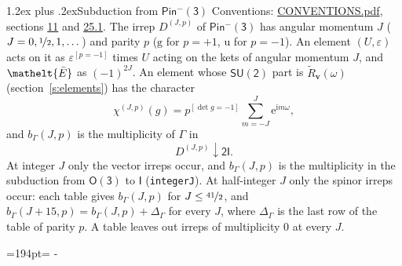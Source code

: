 \documentclass[10pt,a4paper]{article}
\makeatletter
\renewcommand\section{\@startsection{section}{1}{\z@}{-3ex plus -1ex minus -.2ex}%
  {1.2ex plus .2ex}{\normalfont\large\sffamily\bfseries\color{parttitle}}}
\newcommand{\needspace}[1]{\par\penalty-100\begingroup\dimen0=#1\relax\dimen2=\pagegoal
  \advance\dimen2-\pagetotal\ifdim\dimen0>\dimen2\relax\ifdim\dimen2>0pt\vfil\break\fi\fi
  \endgroup}
\numberwithin{equation}{section}
\newcommand{\eltfont}[1]{{\let\sigma\eltsigma\mathelt{#1}}}
\newcommand{\grp}[1]{\mathsf{#1}}
\newcommand{\elt}[1]{\eltfont{#1}}
\newcommand{\ptag}[1]{\mathrm{#1}}
\newcommand{\iverson}[1]{[#1]}
\newcommand{\restr}[2]{#1\!\downarrow#2}
\newcommand{\vv}{\mathbf{v}}
\newcommand{\iunit}{\mathrm{i}}
\newcommand{\expe}{\mathrm{e}}
\newcommand{\irrJp}[2]{D^{(#1,#2)}}
\newcommand{\barred}[1]{\bar{#1}}
\newcommand{\lift}[1]{\tilde{#1}}
\makeatother
\begin{document}
\section{Subduction from \texorpdfstring{$\grp{Pin^{-}(3)}$}{Pin(3)}}\label{s:subduction_parent}
Conventions: \href{../../CONVENTIONS.pdf}{CONVENTIONS.pdf}, sections \href{../../../rotation/CONVENTIONS.pdf\#conv.11}{11} and \href{../../CONVENTIONS.pdf\#conv.25.1}{25.1}.
\leavevmode\label{n:index.J}\label{n:index.parity}\label{n:irrep.o3}The irrep $\irrJp{J}{p}$ of \href{Pinminus3.pdf}{$\grp{Pin^{-}(3)}$} has angular momentum $J$ ($J = 0, \nicefrac{1}{2}, 1, \dots$) and parity $p$ ($\ptag{g}$ for $p = +1$, $\ptag{u}$ for $p = -1$). An element $(U, \varepsilon)$ acts on it as $\varepsilon^{[p = -1]}$ times $U$ acting on the kets of angular momentum $J$, and $\elt{\barred{E}}$ as $(-1)^{2J}$. \label{n:function.character.parent}\label{n:function.multiplicity}An element whose $\grp{SU(2)}$ part is $\lift{R}_{\vv}(\omega)$ (section~\ref{s:elements}) has the character
\begin{equation}\label{e:chi}\chi^{(J,p)}(g) = p^{\iverson{\det g = -1}}\sum_{m=-J}^{J} \expe^{\iunit m\omega},\end{equation}
and $b_\Gamma(J, p)$ is the multiplicity of $\Gamma$ in
\begin{equation}\label{e:parent}\restr{\irrJp{J}{p}}{\grp{2I}}.\end{equation}
At integer $J$ only the vector irreps occur, and $b_\Gamma(J, p)$ is the multiplicity in the subduction from $\grp{O(3)}$ to \href{../../../rotation/data/pdf/I.pdf}{$\grp{I}$} (\texttt{integerJ}). \label{n:index.increment}At half-integer $J$ only the spinor irreps occur: each table gives $b_\Gamma(J, p)$ for $J \le \nicefrac{41}{2}$, and $b_\Gamma(J + 15, p) = b_\Gamma(J, p) + \Delta_\Gamma$ for every $J$, where $\Delta_\Gamma$ is the last row of the table of parity $p$. A table leaves out irreps of multiplicity 0 at every $J$.
\needspace{194pt}
\end{document}
